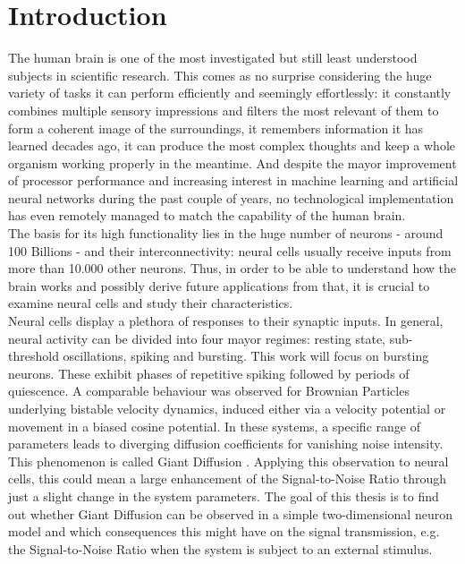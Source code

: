 \documentclass[12pt,a4paper]{article}
\begin{document}

 

\maketitle

\thispagestyle{empty}
\newpage

\tableofcontents
\thispagestyle{empty}
\newpage
{}

\section{Introduction}

The human brain is one of the most investigated but still least understood subjects in scientific research. This comes as no surprise considering the huge variety of tasks it can perform efficiently and seemingly effortlessly: it constantly combines multiple sensory impressions and filters the most relevant of them to form a coherent image of the surroundings, it remembers information it has learned decades ago, it can produce the most complex thoughts and keep a whole organism working properly in the meantime. And despite the mayor improvement of processor performance and increasing interest in machine learning and artificial neural networks during the past couple of years, no technological implementation has even remotely managed to match the capability of the human brain.\\
The basis for its high functionality lies in the huge number of neurons - around 100 Billions\cite{eqnum} - and their interconnectivity: neural cells usually receive inputs from more than 10.000 other neurons\cite{izi}. Thus, in order to be able to understand how the brain works and possibly derive future applications from that, it is crucial to examine neural cells and study their characteristics. \\
Neural cells display a plethora of responses to their synaptic inputs. In general, neural activity can be divided into four mayor regimes: resting state, sub-threshold oscillations, spiking and bursting\cite{dnb}. This work will focus on bursting neurons. These exhibit phases of repetitive spiking followed by periods of quiescence. A comparable behaviour was observed for Brownian Particles underlying bistable velocity dynamics\cite{abp}\cite{bpp}, induced either via a velocity potential or movement in a biased cosine potential. In these systems, a specific range of parameters leads to diverging diffusion coefficients for vanishing noise intensity. This phenomenon is called \glqq Giant Diffusion \grqq. Applying this observation to neural cells, this could mean a large enhancement of the Signal-to-Noise Ratio through just a slight change in the system parameters. The goal of this thesis is to find out whether Giant Diffusion can be observed in a simple two-dimensional neuron model and which consequences this might have on the signal transmission, e.g. the Signal-to-Noise Ratio when the system is subject to an external stimulus.
\end{document}
